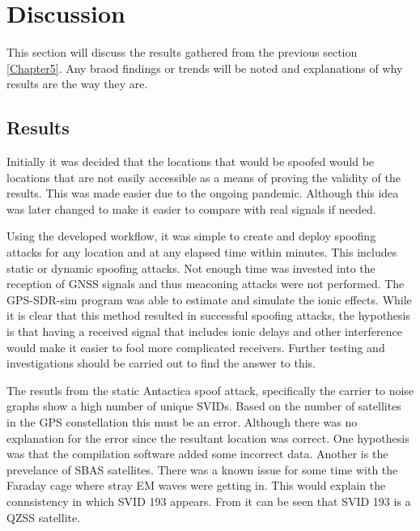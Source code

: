 
\chapter{Discussion} %

\label{Chapter6} %
This section will discuss the results gathered from the previous section \ref{Chapter5}. Any braod findings or trends will be noted and explanations of why results are
the way they are.


\section{Results}
Initially it was decided that the locations that would be spoofed would be locations that are not easily accessible as a means of proving the validity of the results.
This was made easier due to the ongoing pandemic. Although this idea was later changed to make it easier to compare with real signals if needed.

Using the developed workflow, it was simple to create and deploy spoofing attacks for any location and at any elapsed time within minutes. This includes static or dynamic
spoofing attacks. Not enough time was invested into the reception of GNSS signals and thus meaconing attacks were not performed. The GPS-SDR-sim program was able to
estimate and simulate the ionic effects. While it is clear that this method resulted in successful spoofing attacks, the hypothesis is that having a received signal that includes ionic delays
and other interference would make it easier to fool more complicated receivers. Further testing and investigations should be carried out to find the answer to this. 

The resutls from the static Antactica spoof attack, specifically the carrier to noise graphs show a high number of unique SVIDs. Based on the number of satellites in the
GPS constellation this must be an error. Although there was no explanation for the error since the resultant location was correct. One hypothesis was that the compilation
software added some incorrect data. Another is the prevelance of SBAS satellites. There was a known issue for some time with the Faraday cage where stray EM waves were
getting in. This would explain the connsistency in which SVID 193 appears. From  it can be seen that SVID 193 is a QZSS satellite.

